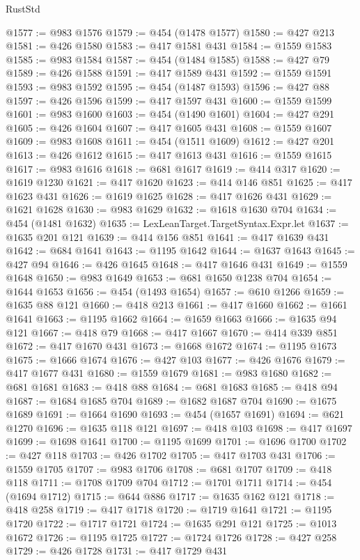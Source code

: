\begin{lexlean}{RustStd}
\begin{coremodule}
@1577 := @983 @1576
@1579 := @454 (@1478 @1577)
@1580 := @427 @213
@1581 := @426 @1580
@1583 := @417 @1581 @431
@1584 := @1559 @1583
@1585 := @983 @1584
@1587 := @454 (@1484 @1585)
@1588 := @427 @79
@1589 := @426 @1588
@1591 := @417 @1589 @431
@1592 := @1559 @1591
@1593 := @983 @1592
@1595 := @454 (@1487 @1593)
@1596 := @427 @88
@1597 := @426 @1596
@1599 := @417 @1597 @431
@1600 := @1559 @1599
@1601 := @983 @1600
@1603 := @454 (@1490 @1601)
@1604 := @427 @291
@1605 := @426 @1604
@1607 := @417 @1605 @431
@1608 := @1559 @1607
@1609 := @983 @1608
@1611 := @454 (@1511 @1609)
@1612 := @427 @201
@1613 := @426 @1612
@1615 := @417 @1613 @431
@1616 := @1559 @1615
@1617 := @983 @1616
@1618 := @681 @1617
@1619 := @414 @317
@1620 := @1619 @1230
@1621 := @417 @1620
@1623 := @414 @146 @851
@1625 := @417 @1623 @431
@1626 := @1619 @1625
@1628 := @417 @1626 @431
@1629 := @1621 @1628
@1630 := @983 @1629
@1632 := @1618 @1630 @704
@1634 := @454 (@1481 @1632)
@1635 := LexLeanTarget.TargetSyntax.Expr.let
@1637 := @1635 @201 @121
@1639 := @414 @156 @851
@1641 := @417 @1639 @431
@1642 := @684 @1641
@1643 := @1195 @1642
@1644 := @1637 @1643
@1645 := @427 @94
@1646 := @426 @1645
@1648 := @417 @1646 @431
@1649 := @1559 @1648
@1650 := @983 @1649
@1653 := @681 @1650 @1238 @704
@1654 := @1644 @1653
@1656 := @454 (@1493 @1654)
@1657 := @610 @1266
@1659 := @1635 @88 @121
@1660 := @418 @213
@1661 := @417 @1660
@1662 := @1661 @1641
@1663 := @1195 @1662
@1664 := @1659 @1663
@1666 := @1635 @94 @121
@1667 := @418 @79
@1668 := @417 @1667
@1670 := @414 @339 @851
@1672 := @417 @1670 @431
@1673 := @1668 @1672
@1674 := @1195 @1673
@1675 := @1666 @1674
@1676 := @427 @103
@1677 := @426 @1676
@1679 := @417 @1677 @431
@1680 := @1559 @1679
@1681 := @983 @1680
@1682 := @681 @1681
@1683 := @418 @88
@1684 := @681 @1683
@1685 := @418 @94
@1687 := @1684 @1685 @704
@1689 := @1682 @1687 @704
@1690 := @1675 @1689
@1691 := @1664 @1690
@1693 := @454 (@1657 @1691)
@1694 := @621 @1270
@1696 := @1635 @118 @121
@1697 := @418 @103
@1698 := @417 @1697
@1699 := @1698 @1641
@1700 := @1195 @1699
@1701 := @1696 @1700
@1702 := @427 @118
@1703 := @426 @1702
@1705 := @417 @1703 @431
@1706 := @1559 @1705
@1707 := @983 @1706
@1708 := @681 @1707
@1709 := @418 @118
@1711 := @1708 @1709 @704
@1712 := @1701 @1711
@1714 := @454 (@1694 @1712)
@1715 := @644 @886
@1717 := @1635 @162 @121
@1718 := @418 @258
@1719 := @417 @1718
@1720 := @1719 @1641
@1721 := @1195 @1720
@1722 := @1717 @1721
@1724 := @1635 @291 @121
@1725 := @1013 @1672
@1726 := @1195 @1725
@1727 := @1724 @1726
@1728 := @427 @258
@1729 := @426 @1728
@1731 := @417 @1729 @431

\end{coremodule}
\end{lexlean}
